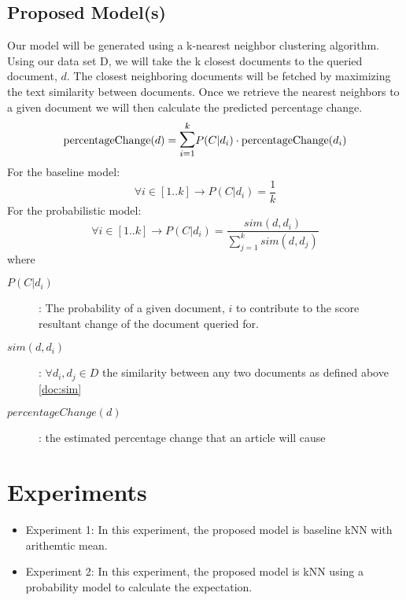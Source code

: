 \documentclass[11pt,letterpaper]{article}
\newcommand{\blue}[1]{\textcolor{RoyalBlue}{#1}}
\newcommand{\instructions}[1]{\blue{\textit{#1}}}
\begin{document}
\subsection{Proposed Model(s)}
\label{sec:proposed-models}
Our model will be generated using a k-nearest neighbor clustering algorithm.
Using our data set D, we will take the k closest documents to the
queried document, \(d\). The closest neighboring documents will be fetched by
maximizing the text similarity between documents. Once we retrieve the
nearest neighbors to a given document we will then calculate the predicted percentage change.
\begin{equation}\label{doc:pDelta}
	\text{percentageChange}(d) = \mathlarger{\mathlarger{\sum}}^k_{i=1} P(C | d_i) \cdot \text{percentageChange}(d_i)
\end{equation}
For the baseline model:
\begin{equation}\label{doc:prob}
	 \forall i \in [1..k] \rightarrow P(C | d_i) = \frac{ 1 }{ k }
\end{equation}
For the probabilistic model:
\begin{equation}\label{doc:prob}
	 \forall i \in [1..k] \rightarrow P(C | d_i) = \frac{ sim(d,d_i) }{\sum^k_{j=1} sim(d, d_j)}
\end{equation}
where
\begin{description}
	\item[\(P(C | d_i)\)] : The probability of a given document, \( i \) to contribute to the score resultant change of the document queried for.
	\item[\textbf{\(sim(d,d_i)\)}] : \( \forall d_i, d_j \in D \) the similarity between any two documents as defined above \eqref{doc:sim}
	\item[\(percentageChange(d)\)] : the estimated percentage change that an article will cause
\end{description}

\section{Experiments}
\begin{itemize}
  \item Experiment 1: In this experiment, the proposed model is
  baseline kNN with arithemtic mean.
  \item Experiment 2: In this experiment, the proposed model is
  kNN using a probability model to calculate the expectation.
\end{itemize}
\end{document}
